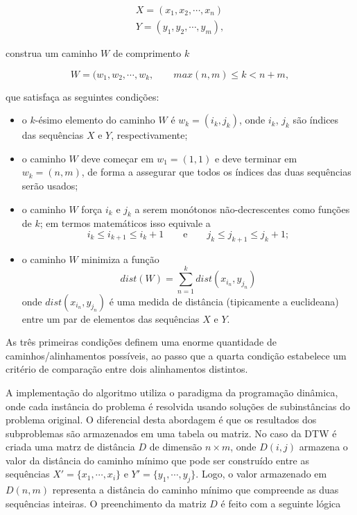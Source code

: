 \begin{align*}
    X = (x_1, x_2, \cdots, x_n) \\
    Y = (y_1, y_2, \cdots, y_m),
\end{align*}

construa um caminho $W$ de comprimento $k$

\begin{equation*}
    W = (w_1, w_2, \cdots, w_k, \qquad max(n, m) \leq k < n + m,
\end{equation*}

\noindent que satisfaça as seguintes condições:

\begin{itemize}
\item o $k$-ésimo elemento do caminho $W$ é $w_k = (i_k, j_k)$, onde $i_k$, $j_k$ são índices das sequências $X$ e $Y$, respectivamente;
\item o caminho $W$ deve começar em $w_1 = (1, 1)$ e deve terminar em $w_k = (n, m)$, de forma a assegurar que todos os índices das duas sequências serão usados;
\item o caminho $W$ força $i_k$ e $j_k$ a serem monótonos não-decrescentes como funções de $k$; em termos matemáticos isso equivale a
\begin{equation*}
    i_k \leq i_{k+1} \leq i_k + 1 \qquad \mbox{e} \qquad j_k\leq j_{k+1} \leq j_k + 1;
\end{equation*}
\item o caminho $W$ minimiza a função 
\begin{equation*}
    dist(W) = \sum_{n=1}^{k} dist(x_{i_n}, y_{j_n})
\end{equation*}
onde $dist(x_{i_n}, y_{j_n})$ é uma medida de distância (tipicamente a euclideana) entre um par de elementos das sequências $X$ e $Y$.
\end{itemize}

As três primeiras condições definem uma enorme quantidade de caminhos/alinhamentos possíveis, ao passo que a quarta condição estabelece um critério de comparação entre dois alinhamentos distintos.


A implementação do algoritmo utiliza o paradigma da programação dinâmica, onde cada instância do problema é resolvida usando soluções de subinstâncias do problema original. O diferencial desta abordagem é que os resultados dos subproblemas são armazenados em uma tabela ou matriz. No caso da DTW é criada uma matrz de distância $D$ de dimensão $n \times m$, onde $D(i, j)$ armazena o valor da distância do caminho mínimo que pode ser construído entre as sequências $X' = \{x_1, \cdots, x_i\}$ e $Y' = \{y_1, \cdots, y_j\}$. Logo, o valor armazenado em $D(n, m)$ representa a distância do caminho mínimo que compreende as duas sequências inteiras. O preenchimento da matriz $D$ é feito com a seguinte lógica

